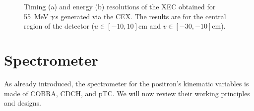 \begin{refsection}
        \begin{figure}[]   
            \centering
            \hfill
            \caption{Timing (a) and energy (b) resolutions of the XEC obtained for \SI{55}{MeV} $\upgamma$s generated via the CEX. The results are for the central region of the detector ($u\in[-10,10]$cm and $v\in[-30,-10]$cm).}
            \label{fig:MEC:XEC:resolution}
        \end{figure}

\section{Spectrometer}
    As already introduced, the spectrometer for the positron's kinematic variables is made of COBRA, CDCH, and pTC.
    We will now review their working principles and designs.


\end{refsection}
